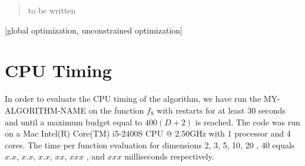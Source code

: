 \documentclass{sig-alternate}
\newcommand{\change}[1]{{\color{red} #1}}
\begin{document}

\maketitle
\begin{abstract}
to be written
\end{abstract}

[global optimization,
unconstrained optimization]



%
%
%
\section{CPU Timing}
In order to evaluate the CPU timing of the algorithm, we have run the \change{MY-ALGORITHM-NAME} on the function $f_{8}$ with restarts for at least 30 seconds and until a maximum budget equal to \change{$400 (D + 2)$} is reached. The code was run on a \change{Mac Intel(R) Core(TM) i5-2400S CPU @ 2.50GHz} with \change{1} processor and \change{4} cores. The time per function evaluation for dimensions 2, 3, 5, 10, 20\change{, 40} equals \change{$x.x$}, \change{$x.x$}, \change{$x.x$}, \change{$xx$}, \change{$xxx$}\change{, and $xxx$} milliseconds respectively. 
\end{document}
